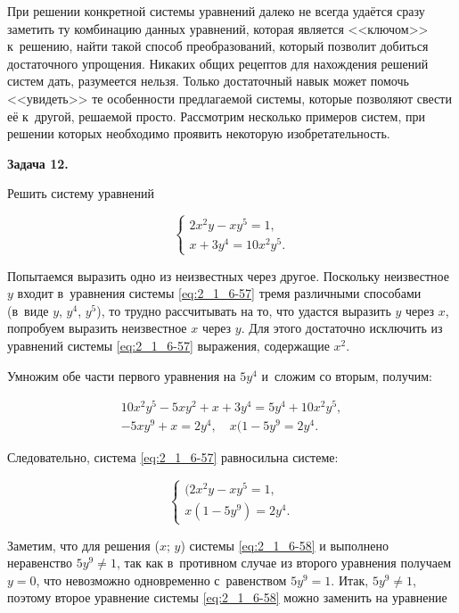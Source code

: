 
При решении конкретной системы уравнений далеко не всегда удаётся сразу
заметить ту комбинацию данных уравнений, которая является <<ключом>>
к~решению, найти такой способ преобразований, который позволит добиться
достаточного упрощения. Никаких общих рецептов для нахождения решений систем
дать, разумеется нельзя. Только достаточный навык может помочь <<увидеть>>
те особенности предлагаемой системы, которые позволяют свести её к~другой,
решаемой просто. Рассмотрим несколько примеров систем, при решении которых
необходимо проявить некоторую изобретательность.

\hypertarget{ex:2_1_6_12}{\textbf{Задача 12.}} Решить систему уравнений

\begin{equation}\label{eq:2_1_6-57}
\begin{cases}
2x^{2}y - xy^{5} = 1, \\
x + 3y^{4} = 10x^{2}y^{5}.
\end{cases}
\end{equation}

Попытаемся выразить одно из неизвестных через другое. Поскольку неизвестное $y$
входит в~уравнения системы \eqref{eq:2_1_6-57} тремя различными способами
(в~виде $y$, $y^{4}$, $y^{5}$), то трудно рассчитывать на то, что удастся выразить
$y$ через $x$, попробуем выразить неизвестное $x$ через $y$.
Для этого достаточно исключить из уравнений системы \eqref{eq:2_1_6-57} выражения,
содержащие $x^{2}$.

Умножим обе части первого уравнения на $5y^{4}$ и~сложим со вторым, получим:

\begin{gather*}
10x^{2}y^{5} - 5xy^{2} + x + 3y^{4} = 5y^{4} + 10x^{2}y^{5}, \\
-5xy^{9} + x = 2y^{4}, \quad x(1 - 5y^{9} = 2y^{4}. 
\end{gather*}

\noindent
Следовательно, система \eqref{eq:2_1_6-57} равносильна системе:

\begin{equation}\label{eq:2_1_6-58}
\begin{cases}
(2x^{2}y - xy^{5} = 1, \\
x(1 - 5y^{9}) = 2y^{4}.
\end{cases}
\end{equation}

Заметим, что для решения ($x$; $y$) системы \eqref{eq:2_1_6-58} и выполнено
неравенство $5y^{9} \ne 1$, так как в~противном случае из второго уравнения
получаем $y = 0$, что невозможно одновременно с~равенством $5y^{9} = 1$.
Итак, $5y^{9} \ne 1$, поэтому второе уравнение системы \eqref{eq:2_1_6-58}
можно заменить на уравнение 

